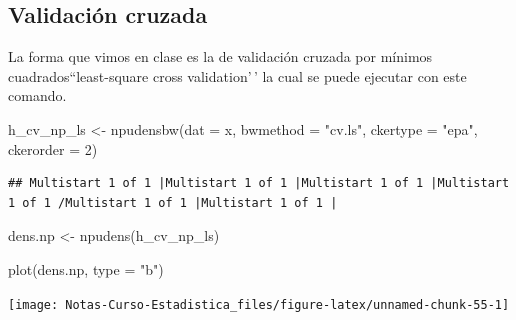 \documentclass[
  12pt,
]{book}
\newenvironment{Shaded}{\begin{snugshade}}{\end{snugshade}}
\newcommand{\AttributeTok}[1]{\textcolor[rgb]{0.77,0.63,0.00}{#1}}
\newcommand{\DecValTok}[1]{\textcolor[rgb]{0.00,0.00,0.81}{#1}}
\newcommand{\FunctionTok}[1]{\textcolor[rgb]{0.00,0.00,0.00}{#1}}
\newcommand{\NormalTok}[1]{#1}
\newcommand{\OtherTok}[1]{\textcolor[rgb]{0.56,0.35,0.01}{#1}}
\newcommand{\StringTok}[1]{\textcolor[rgb]{0.31,0.60,0.02}{#1}}
\theoremstyle{definition}
\theoremstyle{definition}
\theoremstyle{definition}
\theoremstyle{definition}
\theoremstyle{remark}
\begin{document}
\hypertarget{validaciuxf3n-cruzada-1}{%
\subsection{Validación cruzada}\label{validaciuxf3n-cruzada-1}}

La forma que vimos en clase es la de validación cruzada por mínimos
cuadrados``least-square cross validation'\,' la cual se puede ejecutar
con este comando.

\begin{Shaded}
\begin{Highlighting}[]
\NormalTok{h\_cv\_np\_ls }\OtherTok{\textless{}{-}} \FunctionTok{npudensbw}\NormalTok{(}\AttributeTok{dat =}\NormalTok{ x, }\AttributeTok{bwmethod =} \StringTok{"cv.ls"}\NormalTok{,}
    \AttributeTok{ckertype =} \StringTok{"epa"}\NormalTok{, }\AttributeTok{ckerorder =} \DecValTok{2}\NormalTok{)}
\end{Highlighting}
\end{Shaded}

\begin{verbatim}
## Multistart 1 of 1 |Multistart 1 of 1 |Multistart 1 of 1 |Multistart 1 of 1 /Multistart 1 of 1 |Multistart 1 of 1 |                   
\end{verbatim}

\begin{Shaded}
\begin{Highlighting}[]
\NormalTok{dens.np }\OtherTok{\textless{}{-}} \FunctionTok{npudens}\NormalTok{(h\_cv\_np\_ls)}

\FunctionTok{plot}\NormalTok{(dens.np, }\AttributeTok{type =} \StringTok{"b"}\NormalTok{)}
\end{Highlighting}
\end{Shaded}

\begin{center}\texttt{[image: Notas-Curso-Estadistica\_files/figure-latex/unnamed-chunk-55-1]} \end{center}
\end{document}
